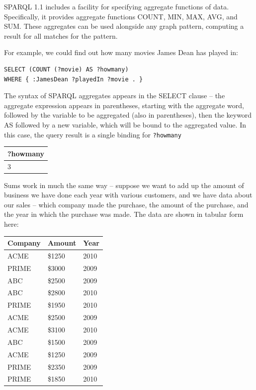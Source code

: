 SPARQL 1.1 includes a facility for specifying aggregate functions of
data. Specifically, it provides aggregate functions COUNT, MIN, MAX,
AVG, and SUM. These aggregates can be used alongside any graph pattern,
computing a result for all matches for the pattern.

For example, we could find out how many movies James Dean has played in:

\begin{lstlisting}
SELECT (COUNT (?movie) AS ?howmany)
WHERE { :JamesDean ?playedIn ?movie . }
\end{lstlisting}


The syntax of SPARQL aggregates appears in the SELECT clause -- the
aggregate expression appears in parentheses, starting with the aggregate
word, followed by the variable to be aggregated (also in parentheses),
then the keyword AS followed by a new variable, which will be bound to
the aggregated value. In this case, the query result is a single binding
for \texttt{?howmany}

\begin{tabular}{|l|}
\hline
?howmany\\
\hline
3\\
\hline
\end{tabular}

Sums work in much the same way -- suppose we want to add up the amount
of business we have done each year with various customers, and we have
data about our sales -- which company made the purchase, the amount of
the purchase, and the year in which the purchase was made. The data are
shown in tabular form here:


\begin{tabular}{|lll|}
\hline
Company&Amount&Year\\
\hline
ACME&\$1250&2010\\
PRIME&\$3000&2009\\
ABC&\$2500&2009\\
ABC&\$2800&2010\\
PRIME&\$1950&2010\\
ACME&\$2500&2009\\
ACME&\$3100&2010\\
ABC&\$1500&2009\\
ACME&\$1250&2009\\
PRIME&\$2350&2009\\
PRIME&\$1850&2010\\
\hline
\end{tabular}


